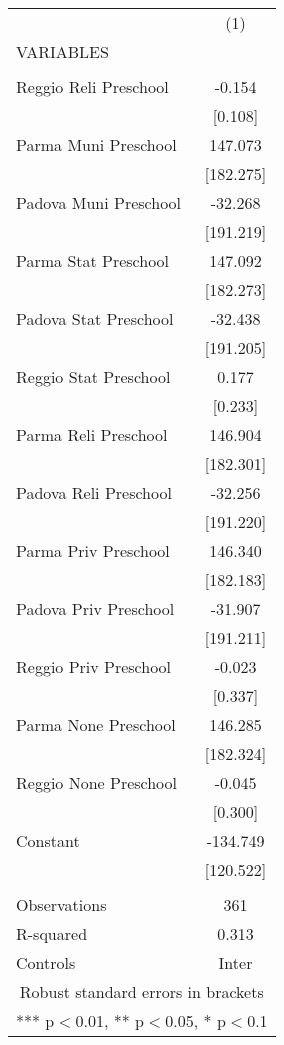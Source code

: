 \begin{tabular}{lc} \hline
 & (1) \\
VARIABLES &  \\ \hline
 &  \\
Reggio Reli Preschool & -0.154 \\
 & [0.108] \\
Parma Muni Preschool & 147.073 \\
 & [182.275] \\
Padova Muni Preschool & -32.268 \\
 & [191.219] \\
Parma Stat Preschool & 147.092 \\
 & [182.273] \\
Padova Stat Preschool & -32.438 \\
 & [191.205] \\
Reggio Stat Preschool & 0.177 \\
 & [0.233] \\
Parma Reli Preschool & 146.904 \\
 & [182.301] \\
Padova Reli Preschool & -32.256 \\
 & [191.220] \\
Parma Priv Preschool & 146.340 \\
 & [182.183] \\
Padova Priv Preschool & -31.907 \\
 & [191.211] \\
Reggio Priv Preschool & -0.023 \\
 & [0.337] \\
Parma None Preschool & 146.285 \\
 & [182.324] \\
Reggio None Preschool & -0.045 \\
 & [0.300] \\
Constant & -134.749 \\
 & [120.522] \\
 &  \\
Observations & 361 \\
R-squared & 0.313 \\
 Controls & Inter \\ \hline
\multicolumn{2}{c}{ Robust standard errors in brackets} \\
\multicolumn{2}{c}{ *** p$<$0.01, ** p$<$0.05, * p$<$0.1} \\
\end{tabular}
